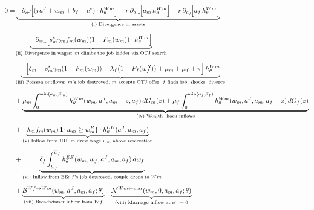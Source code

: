 \documentclass{article}
\begin{document}
\begin{align}
    0 &= \underbrace{-\partial_{a^J}\!\Big[(ra^J + w_m + b_f - c^*)\cdot h_\theta^{Wm}\Big] - r\,\partial_{a_m}\!\Big[a_m\, h_\theta^{Wm}\Big] - r\,\partial_{a_f}\!\Big[a_f\, h_\theta^{Wm}\Big]}_{\text{(i) Divergence in assets}} \notag\\[6pt]
    &\quad \underbrace{- \partial_{w_m}\!\Big[s_m^*\gamma_m f_m(w_m)(1-F_m(w_m))\cdot h_\theta^{Wm}\Big]}_{\text{(ii) Divergence in wages: $m$ climbs the job ladder via OTJ search}} \notag\\[6pt]
    &\quad \underbrace{- \Big[\delta_m + s_m^*\gamma_m(1-F_m(w_m)) + \lambda_f\big(1-F_f(w_f^R)\big) + \mu_m + \mu_f + \pi\Big]\, h_\theta^{Wm}}_{\text{(iii) Poisson outflows: $m$'s job destroyed, $m$ accepts OTJ offer, $f$ finds job, shocks, divorce}} \notag\\[6pt]
    &\quad + \underbrace{\mu_m \int_0^{\min(a_m,\bar{z}_m)} h_\theta^{Wm}(w_m, a^J, a_m-z, a_f)\, dG_m(z) + \mu_f \int_0^{\min(a_f,\bar{z}_f)} h_\theta^{Wm}(w_m, a^J, a_m, a_f-z)\, dG_f(z)}_{\text{(iv) Wealth shock inflows}} \notag\\[6pt]
    &\quad + \underbrace{\lambda_m f_m(w_m)\,\mathbf{1}\{w_m \geq w_m^R\}\cdot h_\theta^{UU}(a^J, a_m, a_f)}_{\text{(v) Inflow from UU: $m$ drew wage $w_m$ above reservation}} \notag\\[6pt]
    &\quad + \underbrace{\delta_f \int_{\underline{w}_f}^{\overline{w}_f} h_\theta^{EE}(w_m, w_f, a^J, a_m, a_f)\, dw_f}_{\text{(vi) Inflow from EE: $f$'s job destroyed, couple drops to $Wm$}} \notag\\[6pt]
    &\quad + \underbrace{\mathcal{B}^{Wf\to Wm}(w_m, a^J, a_m, a_f;\theta)}_{\text{(vii) Breadwinner inflow from $Wf$}} + \underbrace{\mathcal{N}^{Wm\leftarrow\text{mar}}(w_m, 0, a_m, a_f;\theta)}_{\text{(viii) Marriage inflow at $a^J=0$}}
    \label{eq:KFE_Wm}
\end{align}
\end{document}
